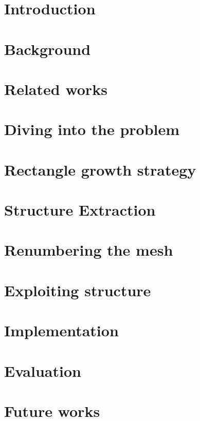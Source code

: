 \documentclass{report}
\begin{document}
\chapter{Introduction}


\chapter{Background}


\chapter{Related works}


\chapter{Diving into the problem}


\chapter{Rectangle growth strategy}


\chapter{Structure Extraction}


\chapter{Renumbering the mesh} %


\chapter{Exploiting structure}


\chapter{Implementation}


\chapter{Evaluation}


\chapter{Future works}



\nocite{*} %


\end{document}
